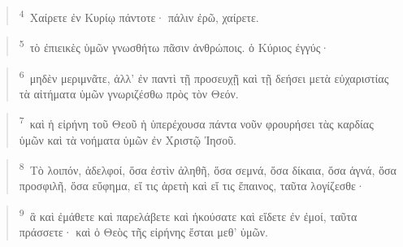 \documentclass{article}
\newcommand{\currentverse}{1} %
\newcommand{\setcurrentverse}[1]{\renewcommand{\currentverse}{#1}}
\begin{document}
\begin{verse}

\setcurrentverse{4}

\setcounter{footnote}{0}

\textsuperscript{4}~Χαίρετε ἐν Κυρίῳ πάντοτε· πάλιν ἐρῶ, χαίρετε.

\end{verse}

\begin{verse}

\setcurrentverse{5}

\setcounter{footnote}{0}

\textsuperscript{5}~τὸ ἐπιεικὲς ὑμῶν γνωσθήτω πᾶσιν ἀνθρώποις. ὁ Κύριος ἐγγύς·

\end{verse}

\begin{verse}

\setcurrentverse{6}

\setcounter{footnote}{0}

\textsuperscript{6}~μηδὲν μεριμνᾶτε, ἀλλ’ ἐν παντὶ τῇ προσευχῇ καὶ τῇ δεήσει μετὰ εὐχαριστίας τὰ αἰτήματα ὑμῶν γνωριζέσθω πρὸς τὸν Θεόν.

\end{verse}

\begin{verse}

\setcurrentverse{7}

\setcounter{footnote}{0}

\textsuperscript{7}~καὶ ἡ εἰρήνη τοῦ Θεοῦ ἡ ὑπερέχουσα πάντα νοῦν φρουρήσει τὰς καρδίας ὑμῶν καὶ τὰ νοήματα ὑμῶν ἐν Χριστῷ Ἰησοῦ.

\end{verse}

\begin{verse}

\setcurrentverse{8}

\setcounter{footnote}{0}

\textsuperscript{8}~Τὸ λοιπόν, ἀδελφοί, ὅσα ἐστὶν ἀληθῆ, ὅσα σεμνά, ὅσα δίκαια, ὅσα ἁγνά, ὅσα προσφιλῆ, ὅσα εὔφημα, εἴ τις ἀρετὴ καὶ εἴ τις ἔπαινος, ταῦτα λογίζεσθε·

\end{verse}

\begin{verse}

\setcurrentverse{9}

\setcounter{footnote}{0}

\textsuperscript{9}~ἃ καὶ ἐμάθετε καὶ παρελάβετε καὶ ἠκούσατε καὶ εἴδετε ἐν ἐμοί, ταῦτα πράσσετε· καὶ ὁ Θεὸς τῆς εἰρήνης ἔσται μεθ’ ὑμῶν.

\end{verse}
\end{document}
